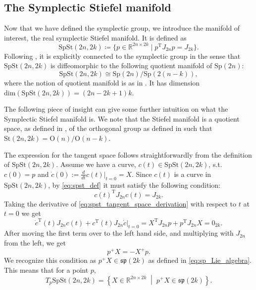 \subsection{The Symplectic Stiefel manifold}
Now that we have defined the symplectic group, we introduce the manifold of interest, the real symplectic Stiefel manifold. It is defined as
\begin{equation}\label{eq:spst_def}
    \mathrm{SpSt}(2n, 2k)\coloneqq \{p\in \mathbb{R}^{2n\times2k} \;|\; p ^{\mathrm{T}}J_{2n}p=J_{2k}\}.
\end{equation}
Following \cite[Prop.~3.1]{BendokatZimmermann2021}, it is explicitly connected to the symplectic group in the sense that $\mathrm{SpSt}(2n, 2k)$ is diffeomorphic to the following quotient manifold of $\mathrm{Sp}(2n)$:
\begin{equation*}
    \mathrm{SpSt}(2n, 2k)\cong \mathrm{Sp}(2n)/\mathrm{Sp}(2(n-k)),
\end{equation*}
where the notion of quotient manifold is as in . It has dimension $\mathrm{dim}(\mathrm{SpSt}(2n, 2k))=(2n-2k+1)k$. 

The following piece of insight can give some further intuition on what the Symplectic Stiefel manifold is. We note that the Stiefel manifold is a quotient space, as defined in , of the orthogonal group as defined in  such that $\mathrm{St}(2n, 2k)=\mathrm{O}(n)/\mathrm{O}(n-k)$. 

The expression for the tangent space follows straightforwardly from the definition of $\mathrm{SpSt}(2n, 2k)$. Assume we have a curve, $c(t)\in \mathrm{SpSt}(2n,2k)$, s.t. $c(0)=p$ and $\dot{c}(0):=\tfrac{d}{dt}c(t)|_{t=0}=X$. Since $c(t)$ is a curve in $\mathrm{SpSt}(2n,2k)$, by \eqref{eq:spst_def} it must satisfy the following condition:
\begin{equation}\label{eq:spst_tangent_space_derivation}
    c(t) ^{\mathrm{T}}J_{2n}c(t)=J_{2k}.
\end{equation}
Taking the derivative of \eqref{eq:spst_tangent_space_derivation} with respect to $t$ at $t=0$ we get
\begin{equation*}
    \dot{c}^{\mathrm{T}}(t)J_{2n}c(t)+c^{\mathrm{T}}(t)J_{2n}\dot{c}\big|_{t=0}=X ^{\mathrm{T}}J_{2n}p+p ^{\mathrm{T}}J_{2n}X=0_{2k}.
\end{equation*}
After moving the first term over to the left hand side, and multiplying with $J_{2n}$ from the left, we get
\begin{equation*}
    p^{+}X=-X^{+}p.
\end{equation*}
We recognize this condition as $p^{+}X\in \mathfrak{sp}(2k)$ as defined in \eqref{eq:sp_Lie_algebra}. This means that for a point $p$, 
\begin{equation}\label{eq:spst_tangent_space}
    T_{p}\mathrm{SpSt}(2n,2k)=\left\{X\in \mathbb{R}^{2n\times2k}\;\middle|\;p^{+}X\in\mathfrak{sp}(2k)\right\}.
\end{equation}
